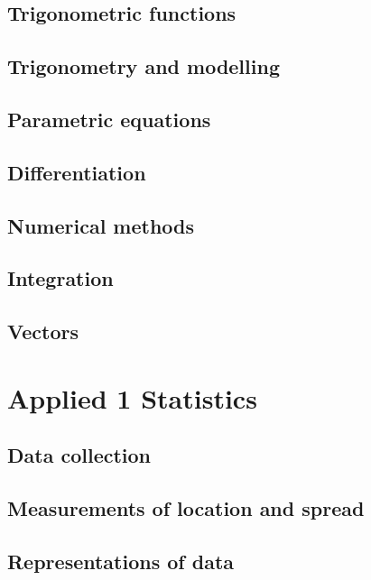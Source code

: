\documentclass[oneside,fleqn,11pt]{book}
\begin{document}
\chapter{Trigonometric functions}


\chapter{Trigonometry and modelling}


\chapter{Parametric equations}


\chapter{Differentiation}


\chapter{Numerical methods}


\chapter{Integration}


\chapter{Vectors}


\part{Applied 1 Statistics}
\chapter{Data collection}


\chapter{Measurements of location and spread}


\chapter{Representations of data}

\end{document}

